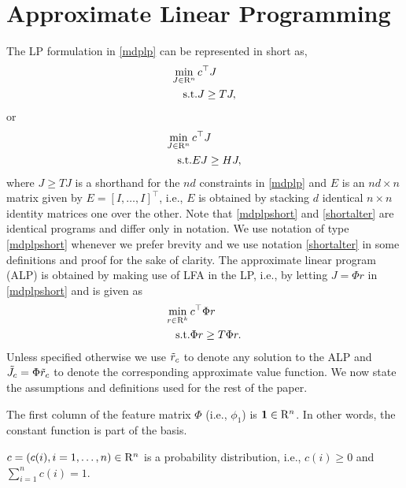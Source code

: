 \section{Approximate Linear Programming}
The LP formulation in \eqref{mdplp} can be represented in short as,
\begin{align}
\begin{split}
\label{mdplpshort}
\min_{J\in \R^n}\, &c^\top J\\
\text{s.t.}\mb &J\geq T J,
\end{split}
\end{align}
or 
\begin{align}
\begin{split}
\label{shortalter}
\min_{J\in \R^n} \,&c^\top J\\
\text{s.t.}\mb &EJ\geq H J,
\end{split}
\end{align}
where $J\geq TJ$ is a shorthand for the $nd$ constraints in \eqref{mdplp} and $E$ is an $nd\times n$ matrix given by $E=[I,\ldots,I]^\top$, i.e., $E$ is obtained by stacking $d$ identical $n\times n$ identity matrices one over the other. Note that \eqref{mdplpshort} and \eqref{shortalter} are identical programs and differ only in notation. We use notation of type \eqref{mdplpshort} whenever we prefer brevity and we use notation \eqref{shortalter} in some definitions and proof for the sake of clarity.
The approximate linear program (ALP) is obtained by making use of LFA in the LP, i.e., by letting $J=\Phi r$ in \eqref{mdplpshort} and is given as
\begin{align}\label{alp}
\begin{split}
\min_{r\in \R^k}\, &c^\top \Phi r\\
\text{s.t.}\mb &\Phi r\geq T \Phi r.
\end{split}
\end{align}
Unless specified otherwise we use $\tilde{r}_c$ to denote any solution to the ALP and $\tilde{J}_c=\Phi \tilde{r}_c$ to denote the corresponding approximate value function. We now state the assumptions and definitions used for the rest of the paper.
\begin{assumption}\label{one}
The first column of the feature matrix $\Phi$ (i.e., $\phi_1$) is $\mathbf{1} \in \mathrm{R}^n$. In other words, the constant function is part of the basis.
\end{assumption}
\begin{assumption}\label{probdist}
$c=(c(i),i=1,\ldots,n)\in \mathrm{R}^n$ is a probability distribution, i.e., $c(i)\geq 0$ and $\sum_{i=1}^n c(i)=1$.
\end{assumption}
